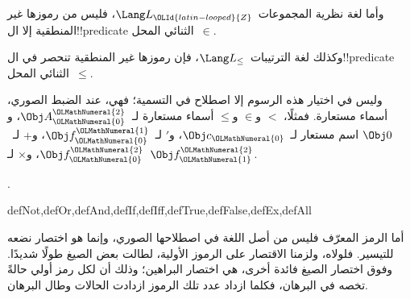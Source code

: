 \documentclass[../../../include/open-logic-section]{subfiles}
\begin{document}
\begin{ex}
وأما لغة نظرية المجموعات~$\Lang L_\OLId{latin-looped}{Z}$، فليس من رموزها غير المنطقية
إلا ال!!{predicate} الثنائي المحل~$\in$.
\end{ex}

\begin{ex}
وكذلك لغة الترتيبات~$\Lang L_\le$، فإن رموزها غير المنطقية تنحصر في
ال!!{predicate} الثنائي المحل~$\le$.
\end{ex}

وليس في اختيار هذه الرسوم إلا اصطلاح في التسمية؛ فهي، عند الضبط
الصوري، أسماء مستعارة. فمثلًا، $<$
و$\in$ و$\le$ أسماء مستعارة لـ~$\Obj A^\OLMathNumeral{2}_\OLMathNumeral{0}$، و$\Obj 0$ اسم مستعار
لـ~$\Obj c_\OLMathNumeral{0}$، و$\prime$ لـ~$\Obj f^\OLMathNumeral{1}_\OLMathNumeral{0}$، و$+$ لـ~$\Obj f^\OLMathNumeral{2}_\OLMathNumeral{0}$،
و$\times$ لـ~$\Obj f^\OLMathNumeral{2}_\OLMathNumeral{1}$.

.

\begin{tagblock}{defNot,defOr,defAnd,defIf,defIff,defTrue,defFalse,defEx,defAll}
\begin{explain}
أما الرمز المعرّف فليس من أصل اللغة في اصطلاحها الصوري، وإنما هو
اختصار نضعه للتيسير. فلولاه، ولزمنا الاقتصار على الرموز الأولية،
لطالت بعض الصيغ طولًا شديدًا. وفوق اختصار الصيغ فائدة أخرى، هي
اختصار البراهين؛ وذلك أن لكل رمز أولي حالةً تخصه في البرهان،
فكلما ازداد عدد تلك الرموز ازدادت الحالات وطال البرهان.
\end{explain}
\end{tagblock}

\end{document}
